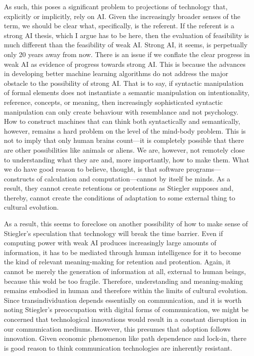 \documentclass[letterpaper,notitlepage,12pt]{article}
\begin{document}
As such, this poses a significant problem to projections of technology that,
explicitly or implicitly, rely on AI.
Given the increasingly broader senses of the term, we should be clear what,
specifically, is the referent.
If the referent is a strong AI thesis, which I argue has to be here, then the
evaluation of feasibility is much different than the feasibility of weak AI.
Strong AI, it seems, is perpetually only 20 years away from now.
There is an issue if we conflate the clear progress in weak AI as evidence of
progress towards strong AI.
This is because the advances in developing better machine learning algorithms
do not address the major obstacle to the possibility of strong AI.
That is to say, if syntactic manipulation of formal elements does not
instantiate a semantic manipulation on intentionality, reference, concepts, or
meaning, then increasingly sophisticated syntactic manipulation can only create
behaviour with resemblance and not psychology.
How to construct machines that can think both syntactically and semantically,
however, remains a hard problem on the level of the mind-body problem.
This is not to imply that only human brains count---it is completely possible
that there are other possibilities like animals or aliens.
We are, however, not remotely close to understanding what they are and, more
importantly, how to make them.
What we do have good reason to believe, thought, is that software
programs---constructs of calculation and computation---cannot by itself be
minds.
As a result, they cannot create retentions or protentions as Stiegler supposes
and, thereby, cannot create the conditions of adaptation to some external thing
to cultural evolution.

As a result, this seems to foreclose on another possibility of how to make sense
of Stiegler's speculation that technology will break the time barrier.
Even if computing power with weak AI produces increasingly large amounts of
information, it has to be mediated through human intelligence for it to become
the kind of relevant meaning-making for retention and protention.
Again, it cannot be merely the generation of information at all, external to
human beings, because this wold be too fragile.
Therefore, understanding and meaning-making remains embodied in human and
therefore within the limits of cultural evolution.
Since transindividuation depends essentially on communication, and it is worth
noting Stiegler's preoccupation with digital forms of communication, we might be
concerned that technological innovations would result in a constant disruption
in our communication mediums.
However, this presumes that adoption follows innovation.
Given economic phenomenon like path dependence and lock-in, there is good reason
to think communication technologies are inherently resistant.
\end{document}
